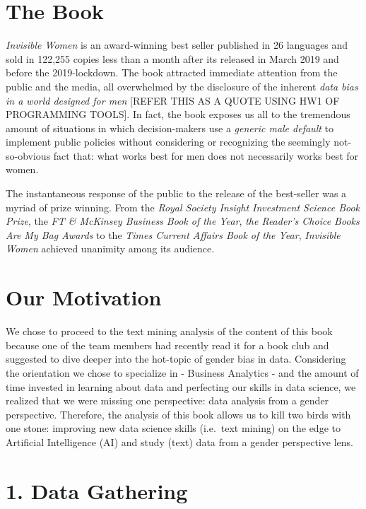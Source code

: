 \documentclass[
]{article}
\begin{document}
\hypertarget{the-book}{%
\section{The Book}\label{the-book}}

\emph{Invisible Women} is an award-winning best seller published in 26
languages and sold in 122,255 copies less than a month after its
released in March 2019 and before the 2019-lockdown. The book attracted
immediate attention from the public and the media, all overwhelmed by
the disclosure of the inherent \emph{data bias in a world designed for
men} {[}REFER THIS AS A QUOTE USING HW1 OF PROGRAMMING TOOLS{]}. In
fact, the book exposes us all to the tremendous amount of situations in
which decision-makers use a \emph{generic male default} to implement
public policies without considering or recognizing the seemingly
not-so-obvious fact that: what works best for men does not necessarily
works best for women.

The instantaneous response of the public to the release of the
best-seller was a myriad of prize winning. From the \emph{Royal Society
Insight Investment Science Book Prize}, the \emph{FT \& McKinsey
Business Book of the Year}, \emph{the Reader's Choice Books Are My Bag
Awards} to the \emph{Times Current Affairs Book of the Year},
\emph{Invisible Women} achieved unanimity among its audience.

\hypertarget{our-motivation}{%
\section{Our Motivation}\label{our-motivation}}

We chose to proceed to the text mining analysis of the content of this
book because one of the team members had recently read it for a book
club and suggested to dive deeper into the hot-topic of gender bias in
data. Considering the orientation we chose to specialize in - Business
Analytics - and the amount of time invested in learning about data and
perfecting our skills in data science, we realized that we were missing
one perspective: data analysis from a gender perspective. Therefore, the
analysis of this book allows us to kill two birds with one stone:
improving new data science skills (i.e.~text mining) on the edge to
Artificial Intelligence (AI) and study (text) data from a gender
perspective lens.

\hypertarget{data-gathering}{%
\section{1. Data Gathering}\label{data-gathering}}
\end{document}
